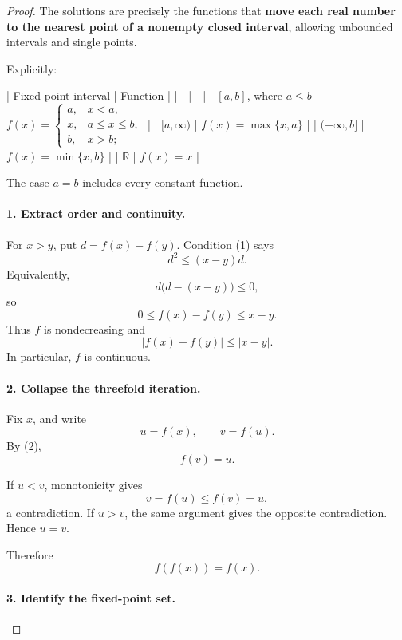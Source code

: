 
\begin{dlsummary}[title={\bfseries Solution 57. The Hidden Interval},breakable]

\begin{proof}
The solutions are precisely the functions that \textbf{move each real number to the nearest point of a nonempty closed interval}, allowing unbounded intervals and single points.

Explicitly:

| Fixed-point interval | Function |
|---|---|
| \([a,b]\), where \(a\le b\) | \(\displaystyle f(x)=\begin{cases}a,&x<a,\\x,&a\le x\le b,\\b,&x>b;\end{cases}\) |
| \([a,\infty)\) | \(f(x)=\max\{x,a\}\) |
| \((-\infty,b]\) | \(f(x)=\min\{x,b\}\) |
| \(\mathbb R\) | \(f(x)=x\) |

The case \(a=b\) includes every constant function.

\paragraph{1. Extract order and continuity.}

For \(x>y\), put \(d=f(x)-f(y)\). Condition (1) says
\[
d^2\le(x-y)d.
\]
Equivalently,
\[
d\bigl(d-(x-y)\bigr)\le0,
\]
so
\[
\boxed{0\le f(x)-f(y)\le x-y.} \tag{3}
\]
Thus \(f\) is nondecreasing and
\[
|f(x)-f(y)|\le|x-y|.
\]
In particular, \(f\) is continuous.

\paragraph{2. Collapse the threefold iteration.}

Fix \(x\), and write
\[
u=f(x),\qquad v=f(u).
\]
By (2),
\[
f(v)=u.
\]

If \(u<v\), monotonicity gives
\[
v=f(u)\le f(v)=u,
\]
a contradiction. If \(u>v\), the same argument gives the opposite contradiction. Hence \(u=v\).

Therefore
\[
\boxed{f(f(x))=f(x).} \tag{4}
\]

\paragraph{3. Identify the fixed-point set.}


\end{proof}
\end{dlsummary}
